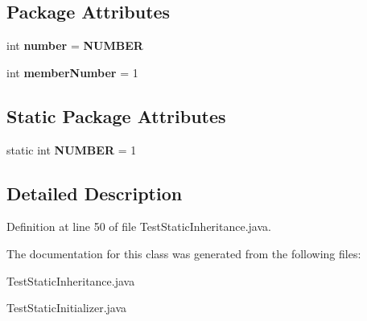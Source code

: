 \subsection*{Package Attributes}
\begin{CompactItemize}
\item 
int {\bf number} = {\bf NUMBER}\label{classClassOne_20ec65c5bc52a2f84ee38f70816ec999}

\item 
int {\bf member\-Number} = 1\label{classClassOne_f694a5edfcf9acd7b65a6befb38a5815}

\end{CompactItemize}
\subsection*{Static Package Attributes}
\begin{CompactItemize}
\item 
static int {\bf NUMBER} = 1\label{classClassOne_2ea5ab820741736b25aac6903be8464c}

\end{CompactItemize}


\subsection{Detailed Description}




Definition at line 50 of file Test\-Static\-Inheritance.java.

The documentation for this class was generated from the following files:\begin{CompactItemize}
\item 
Test\-Static\-Inheritance.java\item 
Test\-Static\-Initializer.java\end{CompactItemize}
